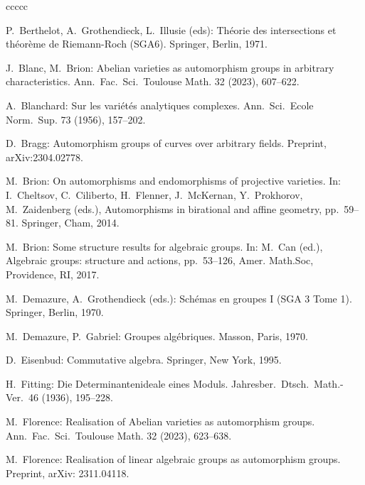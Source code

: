 \documentclass[oneside, 12pt]{amsart}
\theoremstyle{definition}
\theoremstyle{remark}
\begin{document}
\begin{thebibliography}{ccccc}


P.\ Berthelot, A.\ Grothendieck, L.\ Illusie (eds):
Th\'eorie des intersections et th\'eor\`eme de
Riemann-Roch (SGA6).
Springer, Berlin, 1971. 

J.\ Blanc, M.\ Brion:
Abelian varieties as automorphism groups in arbitrary characteristics. 
Ann.\ Fac.\ Sci.\ Toulouse Math. 32 (2023), 607--622.

A.\ Blanchard:
Sur les vari\'et\'es analytiques complexes.  
Ann.\ Sci.\ Ecole Norm.\ Sup. 73 (1956), 157--202. 

D.\ Bragg:
Automorphism groups of curves over arbitrary fields.
Preprint,  arXiv:2304.02778.

M.\ Brion:
On automorphisms and endomorphisms of projective varieties.
In:
I.\ Cheltsov, C.\ Ciliberto, H.\ Flenner, J.\ McKernan, Y.\ Prokhorov, M.\ Zaidenberg (eds.),
Automorphisms in birational and affine geometry, 
pp.\ 59--81.
Springer, Cham, 2014. 

M.\ Brion:
Some structure results for algebraic groups.
In: 
M.\ Can (ed.), 
Algebraic groups: structure and actions,
pp.\ 53--126,
Amer. Math.Soc, Providence, RI, 2017.

M.\ Demazure, A.\ Grothendieck (eds.):
Sch\'emas en groupes I (SGA 3 Tome 1).
Springer, Berlin, 1970.

M.\ Demazure, P.\ Gabriel:
Groupes alg\'ebriques.
Masson, Paris, 1970.

D.\ Eisenbud: 
Commutative algebra.  
Springer, New York, 1995.

H.\ Fitting:
Die Determinantenideale eines Moduls.  
Jahresber.\ Dtsch.\ Math.-Ver.\ 46 (1936), 195--228. 

M.\ Florence:
Realisation of Abelian varieties as automorphism groups.
Ann.\ Fac.\ Sci.\ Toulouse Math. 32 (2023), 623--638.

M.\ Florence:
Realisation of linear algebraic groups as automorphism groups.
Preprint, arXiv: 2311.04118.



\end{thebibliography}
\end{document}
